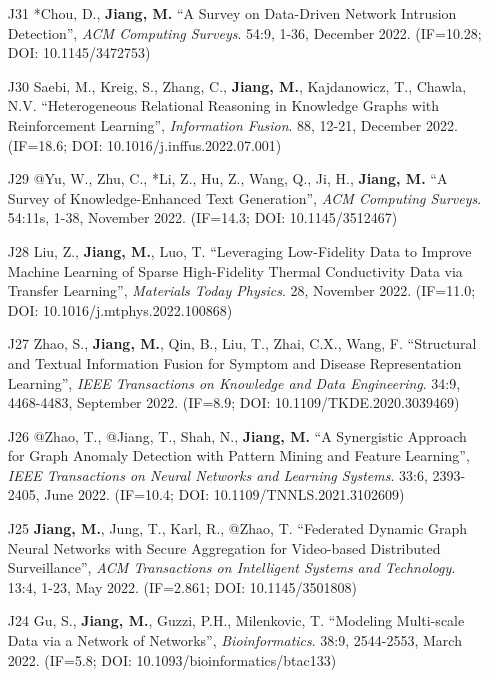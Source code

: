 \documentclass[10pt]{article}
\newenvironment{myindentpar}[1]%
{\begin{list}{}%
         {\setlength{\leftmargin}{#1}}%
         \item[]%
}
{\end{list}}
\newcounter{list}
\begin{document}
\begin{myindentpar}{0.00cm}
\begin{enumerate}[leftmargin=.5cm]
\item[J31] *Chou, D., \textbf{Jiang, M.} ``A Survey on Data-Driven Network Intrusion Detection'', \textit{ACM Computing Surveys}. 54:9, 1-36, December 2022. (IF=10.28; DOI: 10.1145/3472753)

\item[J30] Saebi, M., Kreig, S., Zhang, C., \textbf{Jiang, M.}, Kajdanowicz, T., Chawla, N.V. ``Heterogeneous Relational Reasoning in Knowledge Graphs with Reinforcement Learning'', \textit{Information Fusion}. 88, 12-21, December 2022. (IF=18.6; DOI: 10.1016/j.inffus.2022.07.001)
	
\item[J29] @Yu, W., Zhu, C., *Li, Z., Hu, Z., Wang, Q., Ji, H., \textbf{Jiang, M.} ``A Survey of Knowledge-Enhanced Text Generation'', \textit{ACM Computing Surveys}. 54:11s, 1-38, November 2022. (IF=14.3; DOI: 10.1145/3512467)

\item[J28] Liu, Z., \textbf{Jiang, M.}, Luo, T. ``Leveraging Low-Fidelity Data to Improve Machine Learning of Sparse High-Fidelity Thermal Conductivity Data via Transfer Learning'', \textit{Materials Today Physics}. 28, November 2022. (IF=11.0; DOI: 10.1016/j.mtphys.2022.100868)
	
\item[J27] Zhao, S., \textbf{Jiang, M.}, Qin, B., Liu, T., Zhai, C.X., Wang, F. ``Structural and Textual Information Fusion for Symptom and Disease Representation Learning'', \textit{IEEE Transactions on Knowledge and Data Engineering}. 34:9, 4468-4483, September 2022. (IF=8.9; DOI: 10.1109/TKDE.2020.3039469)

\item[J26] @Zhao, T., @Jiang, T., Shah, N., \textbf{Jiang, M.} ``A Synergistic Approach for Graph Anomaly Detection with Pattern Mining and Feature Learning'', \textit{IEEE Transactions on Neural Networks and Learning Systems}. 33:6, 2393-2405, June 2022. (IF=10.4; DOI: 10.1109/TNNLS.2021.3102609)

\item[J25] \textbf{Jiang, M.}, Jung, T., Karl, R., @Zhao, T. ``Federated Dynamic Graph Neural Networks with Secure Aggregation for Video-based Distributed Surveillance'', \textit{ACM Transactions on Intelligent Systems and Technology}. 13:4, 1-23, May 2022. (IF=2.861; DOI: 10.1145/3501808)

\item[J24] Gu, S., \textbf{Jiang, M.}, Guzzi, P.H., Milenkovic, T. ``Modeling Multi-scale Data via a Network of Networks'', \textit{Bioinformatics}. 38:9, 2544-2553, March 2022. (IF=5.8; DOI: 10.1093/bioinformatics/btac133)


\end{enumerate}
\end{myindentpar}
\end{document}

